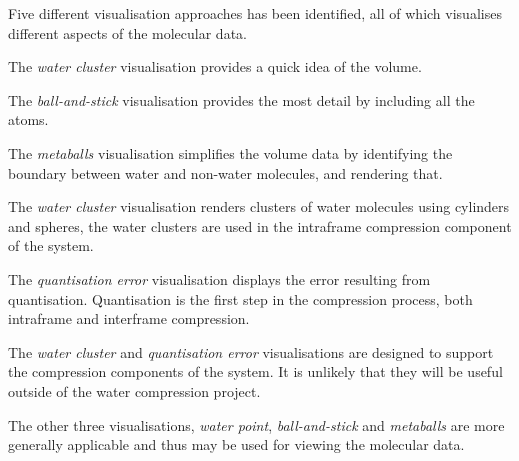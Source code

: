 Five different visualisation approaches has been identified, all of which
visualises different aspects of the molecular data.

The \emph{water cluster} visualisation provides a quick idea of the volume.

The \emph{ball-and-stick} visualisation provides the most detail by including
all the atoms.

The \emph{metaballs} visualisation simplifies the volume data by identifying
the boundary between water and non-water molecules, and rendering that.

The \emph{water cluster} visualisation renders clusters of water molecules
using cylinders and spheres, the water clusters are used in the intraframe
compression component of the system.

The \emph{quantisation error} visualisation displays the error resulting from
quantisation. Quantisation is the first step in the compression process,
both intraframe and interframe compression.

The \emph{water cluster} and \emph{quantisation error} visualisations are
designed to support the compression components of the system. It is unlikely
that they will be useful outside of the water compression project.

The other three visualisations, \emph{water point}, \emph{ball-and-stick} and
\emph{metaballs} are more generally applicable and thus may be used for viewing
the molecular data.



